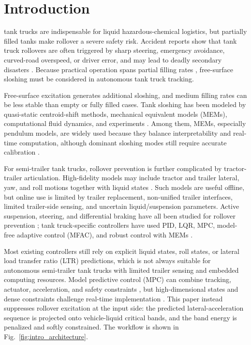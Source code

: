 \section{Introduction}
 tank trucks are indispensable for liquid hazardous-chemical logistics, but partially filled tanks make rollover a severe safety risk. Accident reports show that tank truck rollovers are often triggered by sharp steering, emergency avoidance, curved-road overspeed, or driver error, and may lead to deadly secondary disasters \cite{chengshuo2023,wangyang2023,wenling_accident2022}. Because practical operation spans partial filling rates \cite{biaozhun185642006,biaozhunR00052011}, free-surface sloshing must be considered in autonomous tank truck tracking.

Free-surface excitation generates additional sloshing, and medium filling rates can be less stable than empty or fully filled cases. Tank sloshing has been modeled by quasi-static centroid-shift methods, mechanical equivalent models (MEMs), computational fluid dynamics, and experiments \cite{maohaijian2021fsi,huangyang2017impact,wanying2020antirolover,wangxiaorun2022lateralacc,chenyibao2016crosssection}. Among them, MEMs, especially pendulum models, are widely used because they balance interpretability and real-time computation, although dominant sloshing modes still require accurate calibration \cite{jiaxinhong2022review,salem2000rollover,yangxiujian2018multimass,Komasa2023observing}.

For semi-trailer tank trucks, rollover prevention is further complicated by tractor-trailer articulation. High-fidelity models may include tractor and trailer lateral, yaw, and roll motions together with liquid states \cite{renyuanyuan2020precisemodel,yuzhixin2018mpc,zongchangfu2014identification,niezhigen2015heavyduty}. Such models are useful offline, but online use is limited by trailer replacement, non-unified trailer interfaces, limited trailer-side sensing, and uncertain liquid/suspension parameters. Active suspension, steering, and differential braking have all been studied for rollover prevention \cite{xiao2020rollsuspension,carlson2003rollover,xu2011rollover}; tank truck-specific controllers have used PID, LQR, MPC, model-free adaptive control (MFAC), and robust control with MEMs \cite{zhaoweiqiang2018equivalent,zhaoweiqiang2019semitrailer,Reviewer2_SunWencai2022,MFAC_LiXiansheng2021,zhao2019hinfty,KomasaQi2025AntiRollover_TITS}.

Most existing controllers still rely on explicit liquid states, roll states, or lateral load transfer ratio (LTR) predictions, which is not always suitable for autonomous semi-trailer tank trucks with limited trailer sensing and embedded computing resources. Model predictive control (MPC) can combine tracking, actuator, acceleration, and safety constraints \cite{gongjianwei2020mpcbook}, but high-dimensional states and dense constraints challenge real-time implementation \cite{shengbo2015fastmpc}. This paper instead suppresses rollover excitation at the input side: the predicted lateral-acceleration sequence is projected onto vehicle-liquid critical bands, and the band energy is penalized and softly constrained. The workflow is shown in Fig.~\ref{fig:intro_architecture}.

